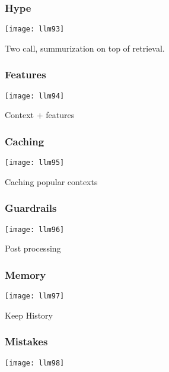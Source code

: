\begin{frame}[fragile]\frametitle{Hype}


\begin{center}
\texttt{[image: llm93]}

\end{center}

Two call, summurization on top of retrieval.
\end{frame}

\begin{frame}[fragile]\frametitle{Features}


\begin{center}
\texttt{[image: llm94]}

\end{center}

Context + features
\end{frame}

\begin{frame}[fragile]\frametitle{Caching}


\begin{center}
\texttt{[image: llm95]}

\end{center}

Caching popular contexts
\end{frame}

\begin{frame}[fragile]\frametitle{Guardrails}


\begin{center}
\texttt{[image: llm96]}

\end{center}

Post processing
\end{frame}

\begin{frame}[fragile]\frametitle{Memory}


\begin{center}
\texttt{[image: llm97]}

\end{center}

Keep History
\end{frame}

\begin{frame}[fragile]\frametitle{Mistakes}


\begin{center}
\texttt{[image: llm98]}

\end{center}

\end{frame}